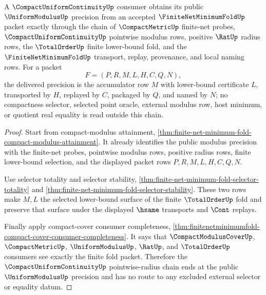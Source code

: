 \begin{theorem}
\label{thm:finite-net-minimum-fold-compact-uniform-pointwise-radius-chain}
A $\CompactUniformContinuityUp$ consumer obtains its public $\UniformModulusUp$ precision from an accepted $\FiniteNetMinimumFoldUp$ packet exactly through the chain of $\CompactMetricUp$ finite-net probes, $\CompactUniformContinuityUp$ pointwise modulus rows, positive $\RatUp$ radius rows, the $\TotalOrderUp$ finite lower-bound fold, and the $\FiniteNetMinimumFoldUp$ transport, replay, provenance, and local naming rows. For a packet
$$
F=(P,R,M,L,H,C,Q,N),
$$
the delivered precision is the accumulator row $M$ with lower-bound certificate $L$, transported by $H$, replayed by $C$, packaged by $Q$, and named by $N$; no compactness selector, selected point oracle, external modulus row, host minimum, or quotient real equality is read outside this chain.
\end{theorem}
\begin{proof}
Start from compact-modulus attainment, \autoref{thm:finite-net-minimum-fold-compact-modulus-attainment}. It already identifies the public modulus precision with the finite-net probes, pointwise modulus rows, positive radius rows, finite lower-bound selection, and the displayed packet rows $P,R,M,L,H,C,Q,N$.

Use selector totality and selector stability, \autoref{thm:finite-net-minimum-fold-selector-totality} and \autoref{thm:finite-net-minimum-fold-selector-stability}. These two rows make $M,L$ the selected lower-bound surface of the finite $\TotalOrderUp$ fold and preserve that surface under the displayed $\hsame$ transports and $\Cont$ replays.

Finally apply compact-cover consumer completeness, \autoref{thm:finitenetminimumfold-compact-cover-consumer-completeness}. It says that $\CompactModulusCoverUp$, $\CompactMetricUp$, $\UniformModulusUp$, $\RatUp$, and $\TotalOrderUp$ consumers see exactly the finite fold packet. Therefore the $\CompactUniformContinuityUp$ pointwise-radius chain ends at the public $\UniformModulusUp$ precision and has no route to any excluded external selector or equality datum.
\end{proof}


